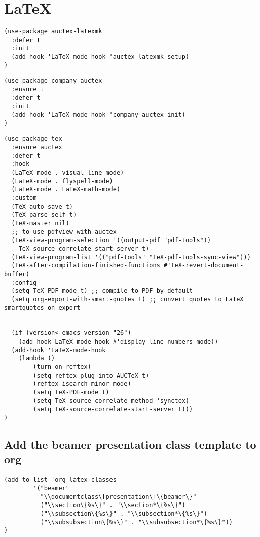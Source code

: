 \documentclass[11pt]{article}
\begin{document}
\section*{\LaTeX{}}
\label{sec:org8abcdcf}

\begin{verbatim}
(use-package auctex-latexmk
  :defer t
  :init
  (add-hook 'LaTeX-mode-hook 'auctex-latexmk-setup)
)
\end{verbatim}


\begin{verbatim}
(use-package company-auctex
  :ensure t
  :defer t
  :init
  (add-hook 'LaTeX-mode-hook 'company-auctex-init)
)
\end{verbatim}

\begin{verbatim}
(use-package tex
  :ensure auctex
  :defer t
  :hook
  (LaTeX-mode . visual-line-mode)
  (LaTeX-mode . flyspell-mode)
  (LaTeX-mode . LaTeX-math-mode)
  :custom
  (TeX-auto-save t)
  (TeX-parse-self t)
  (TeX-master nil)
  ;; to use pdfview with auctex
  (TeX-view-program-selection '((output-pdf "pdf-tools"))
    TeX-source-correlate-start-server t)
  (TeX-view-program-list '(("pdf-tools" "TeX-pdf-tools-sync-view")))
  (TeX-after-compilation-finished-functions #'TeX-revert-document-buffer)
  :config
  (setq TeX-PDF-mode t) ;; compile to PDF by default
  (setq org-export-with-smart-quotes t) ;; convert quotes to LaTeX smartquotes on export


  (if (version< emacs-version "26")
    (add-hook LaTeX-mode-hook #'display-line-numbers-mode))
  (add-hook 'LaTeX-mode-hook
    (lambda ()
        (turn-on-reftex)
        (setq reftex-plug-into-AUCTeX t)
        (reftex-isearch-minor-mode)
        (setq TeX-PDF-mode t)
        (setq TeX-source-correlate-method 'synctex)
        (setq TeX-source-correlate-start-server t)))
)

\end{verbatim}

\subsection*{Add the beamer presentation class template to org}
\label{sec:org68f5673}
\begin{verbatim}
(add-to-list 'org-latex-classes
        '("beamer"
          "\\documentclass\[presentation\]\{beamer\}"
          ("\\section\{%s\}" . "\\section*\{%s\}")
          ("\\subsection\{%s\}" . "\\subsection*\{%s\}")
          ("\\subsubsection\{%s\}" . "\\subsubsection*\{%s\}"))
)
\end{verbatim}
\end{document}
